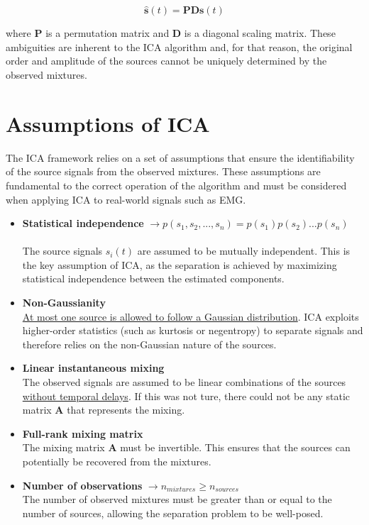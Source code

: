 \begin{equation}
    \hat{\mathbf{s}}(t) = \mathbf{P} \mathbf{D} \mathbf{s}(t)
\end{equation}

\noindent where $\mathbf{P}$ is a permutation matrix and $\mathbf{D}$ is a diagonal scaling matrix. These ambiguities are inherent to the ICA algorithm and, for that reason, the original order and amplitude of the sources cannot be uniquely determined by the observed mixtures.


\section{Assumptions of ICA}
\label{sec:ica_assumptions}

The ICA framework relies on a set of assumptions that ensure the identifiability of the source signals from the observed mixtures. These assumptions are fundamental to the correct operation of the algorithm and must be considered when applying ICA to real-world signals such as EMG.

\begin{itemize}

\item \textbf{Statistical independence} $\rightarrow p(s_1,s_2,...,s_n)=p(s_1)p(s_2)...p(s_n)$ \\ \\
The source signals $s_i(t)$ are assumed to be mutually independent. This is the key assumption of ICA, as the separation is achieved by maximizing statistical independence between the estimated components.

\item \textbf{Non-Gaussianity} \\

\underline{At most one source is allowed to follow a Gaussian distribution}. ICA exploits higher-order statistics (such as kurtosis or negentropy) to separate signals and therefore relies on the non-Gaussian nature of the sources.

\item \textbf{Linear instantaneous mixing} \\

The observed signals are assumed to be linear combinations of the sources \underline{without temporal delays}. If this was not ture, there could not be any static matrix $\mathbf{A}$ that represents the mixing.

\item \textbf{Full-rank mixing matrix} \\

The mixing matrix $\mathbf{A}$ must be invertible. This ensures that the sources can potentially be recovered from the mixtures.

\item \textbf{Number of observations}
$\rightarrow n_{mixtures} \geq n_{sources}$\\

The number of observed mixtures must be greater than or equal to the number of sources, allowing the separation problem to be well-posed.

\end{itemize}

